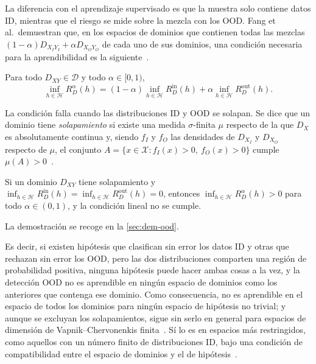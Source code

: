 La diferencia con el aprendizaje supervisado es que la muestra solo contiene datos ID, mientras que el riesgo se mide sobre la mezcla con los OOD. Fang et al.\ demuestran que, en los espacios de dominios que contienen todas las mezclas $(1-\alpha) D_{X_I Y_I} + \alpha D_{X_O Y_O}$ de cada uno de sus dominios, una condición necesaria para la aprendibilidad es la siguiente~\cite[sec.~4 y lema~1]{fang2022}.

\begin{definicion}\label{def:condicion-lineal}
Para todo $D_{XY} \in \mathcal{D}$ y todo $\alpha \in [0, 1)$,
\[
  \inf_{h \in \mathcal{H}} R^{\alpha}_{D}(h) = (1 - \alpha) \inf_{h \in \mathcal{H}} R^{\mathrm{in}}_{D}(h) + \alpha \inf_{h \in \mathcal{H}} R^{\mathrm{out}}_{D}(h).
\]
\end{definicion}

La condición falla cuando las distribuciones ID y OOD se solapan. Se dice que un dominio tiene \emph{solapamiento} si existe una medida $\sigma$-finita $\mu$ respecto de la que $D_X$ es absolutamente continua y, siendo $f_I$ y $f_O$ las densidades de $D_{X_I}$ y $D_{X_O}$ respecto de $\mu$, el conjunto $A = \{x \in \mathcal{X} : f_I(x) > 0,\ f_O(x) > 0\}$ cumple $\mu(A) > 0$~\cite[def.~4]{fang2022}.

\begin{proposicion}\label{prop:solapamiento}
Si un dominio $D_{XY}$ tiene solapamiento y $\inf_{h \in \mathcal{H}} R^{\mathrm{in}}_{D}(h) = \inf_{h \in \mathcal{H}} R^{\mathrm{out}}_{D}(h) = 0$, entonces $\inf_{h \in \mathcal{H}} R^{\alpha}_{D}(h) > 0$ para todo $\alpha \in (0, 1)$, y la condición lineal no se cumple.
\end{proposicion}
La demostración se recoge en la \cref{sec:dem-ood}.

Es decir, si existen hipótesis que clasifican sin error los datos ID y otras que rechazan sin error los OOD, pero las dos distribuciones comparten una región de probabilidad positiva, ninguna hipótesis puede hacer ambas cosas a la vez, y la detección OOD no es aprendible en ningún espacio de dominios como los anteriores que contenga ese dominio. Como consecuencia, no es aprendible en el espacio de todos los dominios para ningún espacio de hipótesis no trivial; y aunque se excluyan los solapamientos, sigue sin serlo en general para espacios de dimensión de Vapnik--Chervonenkis finita~\cite[teors.~4 y~5]{fang2022}. Sí lo es en espacios más restringidos, como aquellos con un número finito de distribuciones ID, bajo una condición de compatibilidad entre el espacio de dominios y el de hipótesis~\cite[sec.~5]{fang2022}.

